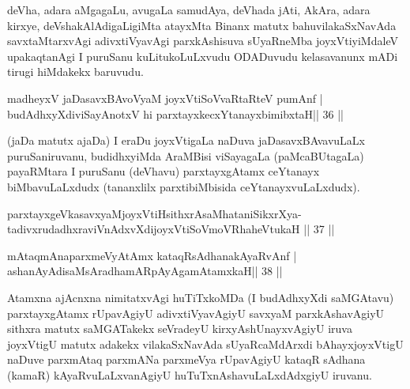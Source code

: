 \begin{artha}
deVha, adara aMgagaLu, avugaLa samudAya, deVhada jAti, AkAra, adara kirxye, deVshakAlAdigaLigiMta atayxMta Binanx matutx bahuvilakaSxNavAda savxtaMtarxvAgi adivxtiVyavAgi parxkAshisuva sUyaRneMba joyxVtiyiMdaleV upakaqtanAgi I puruSanu kuLitukoLuLxvudu ODADuvudu kelasavanunx mADi tirugi hiMdakekx baruvudu.
\end{artha}



\begin{shl}
madheyxV jaDasavxBAvoV\s yaM joyxVtiSoVvaRtaRteV pumAnf | \\
budAdhxyXdiviSayAnotxV hi parxtayxkecxYtanayxbimibxtaH\hfill ||  36 ||  
\end{shl}

\begin{artha}
(jaDa matutx ajaDa) I eraDu joyxVtigaLa naDuva jaDasavxBAvavuLaLx puruSaniruvanu, budidhxyiMda AraMBisi viSayagaLa (paMcaBUtagaLa) payaRMtara I puruSanu (deVhavu) parxtayxgAtamx ceYtanayx biMbavuLaLxdudx (tananxlilx parxtibiMbisida ceYtanayxvuLaLxdudx).
\end{artha}


\begin{shl}
parxtayxgeVkasavxyaMjoyxVtiHsithxrAsaMhataniSikxrXya-\\
tadivxrudadhxraviVnAdxvXdijoyxVtiSoVmoVRhaheVtukaH \hfill||  37 ||  
\end{shl}
				
\begin{shl}
mAtaqmAnaparxmeVyAtAmx kataqRsAdhanakAyaRvAnf |  \\
ashanAyAdisaMsAradhamARpAyAgamAtamxkaH\hfill ||  38 || 
\end{shl}

\begin{artha}
Atamxna ajAcnxna nimitatxvAgi huTiTxkoMDa (I budAdhxyXdi saMGAtavu) parxtayxgAtamx rUpavAgiyU adivxtiVyavAgiyU savxyaM parxkAshavAgiyU sithxra matutx saMGATakekx seVradeyU kirxyAshUnayxvAgiyU iruva joyxVtigU matutx adakekx vilakaSxNavAda sUyaRcaMdArxdi bAhayxjoyxVtigU naDuve parxmAtaq parxmANa parxmeVya rUpavAgiyU kataqR sAdhana (kamaR) kAyaRvuLaLxvanAgiyU huTuTxnAshavuLaLxdAdxgiyU iruvanu.
\end{artha}

